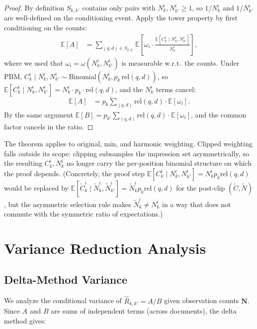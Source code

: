 \documentclass[sigconf]{acmart}
\begin{document}
\begin{proof}
By definition $S_{k,k'}$ contains only pairs with $N_k^i, N_{k'}^i \geq 1$, so
$1/N_k^i$ and $1/N_{k'}^i$ are well-defined on the conditioning event. Apply the
tower property by first conditioning on the counts:
\begin{align*}
\mathbb{E}[A] &= \sum_{(q,d) \in S_{k,k'}} \mathbb{E}\!\left[\omega_i \cdot \frac{\mathbb{E}[C_k^i \mid N_k^i, N_{k'}^i]}{N_k^i}\right],
\end{align*}
where we used that $\omega_i = \omega(N_k^i, N_{k'}^i)$ is measurable w.r.t.\ the
counts. Under PBM, $C_k^i \mid N_k^i, N_{k'}^i \sim \mathrm{Binomial}(N_k^i, p_k\,\textrm{rel}(q,d))$,
so $\mathbb{E}[C_k^i \mid N_k^i, N_{k'}^i] = N_k^i \cdot p_k \cdot \textrm{rel}(q,d)$, and
the $N_k^i$ terms cancel:
\begin{align*}
\mathbb{E}[A] &= p_k \sum_{(q,d)} \textrm{rel}(q,d) \cdot \mathbb{E}[\omega_i].
\end{align*}
By the same argument $\mathbb{E}[B] = p_{k'} \sum_{(q,d)} \textrm{rel}(q,d) \cdot \mathbb{E}[\omega_i]$, and
the common factor cancels in the ratio.
\end{proof}

The theorem applies to original, min, and harmonic weighting. Clipped weighting falls outside
its scope: clipping subsamples the impression set asymmetrically, so the resulting $C_k^i, N_k^i$
no longer carry the per-position binomial structure on which the proof depends. (Concretely,
the proof step $\mathbb{E}[C_k^i \mid N_k^i, N_{k'}^i] = N_k^i p_k \mathrm{rel}(q,d)$ would be
replaced by $\mathbb{E}[\tilde C_k^i \mid \tilde N_k^i, \tilde N_{k'}^i] = \tilde N_k^i p_k
\mathrm{rel}(q,d)$ for the post-clip $(\tilde C, \tilde N)$, but the asymmetric selection rule
makes $\tilde N_k^i \neq N_k^i$ in a way that does not commute with the symmetric ratio of
expectations.)

\section{Variance Reduction Analysis}
\label{sec:variance_reduction}

\subsection{Delta-Method Variance}

We analyze the conditional variance of $\hat{R}_{k,k'} = A/B$ given observation counts $\mathbf{N}$. Since $A$ and $B$ are sums of independent terms (across documents), the delta method gives:
\end{document}

